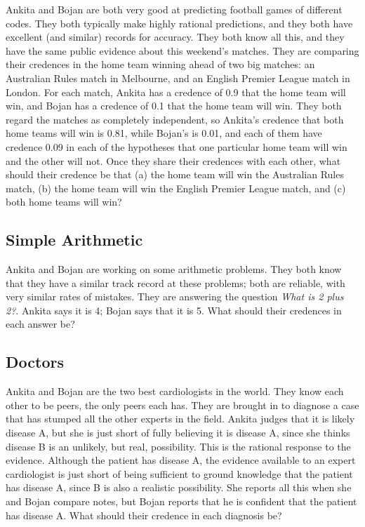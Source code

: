 \documentclass[
  10pt,
  letterpaper,
  twoside]{scrbook}
\begin{document}
{Ankita} and {Bojan} are both very good at predicting football games of
different codes. They both typically make highly rational predictions,
and they both have excellent (and similar) records for accuracy. They
both know all this, and they have the same public evidence about this
weekend's matches. They are comparing their credences in the home team
winning ahead of two big matches: an Australian Rules match in
Melbourne, and an English Premier League match in London. For each
match, {Ankita} has a credence of 0.9 that the home team will win, and
{Bojan} has a credence of 0.1 that the home team will win. They both
regard the matches as completely independent, so {Ankita}'s credence
that both home teams will win is 0.81, while {Bojan}'s is 0.01, and each
of them have credence 0.09 in each of the hypotheses that one particular
home team will win and the other will not. Once they share their
credences with each other, what should their credence be that (a) the
home team will win the Australian Rules match, (b) the home team will
win the English Premier League match, and (c) both home teams will win?

\subsection{Simple Arithmetic}\label{simplearithmetic}

{Ankita} and {Bojan} are working on some arithmetic problems. They both
know that they have a similar track record at these problems; both are
reliable, with very similar rates of mistakes. They are answering the
question \emph{What is 2 plus 2?}. {Ankita} says it is 4; {Bojan} says
that it is 5. What should their credences in each answer be?

\subsection{Doctors}\label{doctors}

{Ankita} and {Bojan} are the two best cardiologists in the world. They
know each other to be peers, the only peers each has. They are brought
in to diagnose a case that has stumped all the other experts in the
field. {Ankita} judges that it is likely disease A, but she is just
short of fully believing it is disease A, since she thinks disease B is
an unlikely, but real, possibility. This is the rational response to the
evidence. Although the patient has disease A, the evidence available to
an expert cardiologist is just short of being sufficient to ground
knowledge that the patient has disease A, since B is also a realistic
possibility. She reports all this when she and {Bojan} compare notes,
but {Bojan} reports that he is confident that the patient has disease A.
What should their credence in each diagnosis be?
\end{document}
